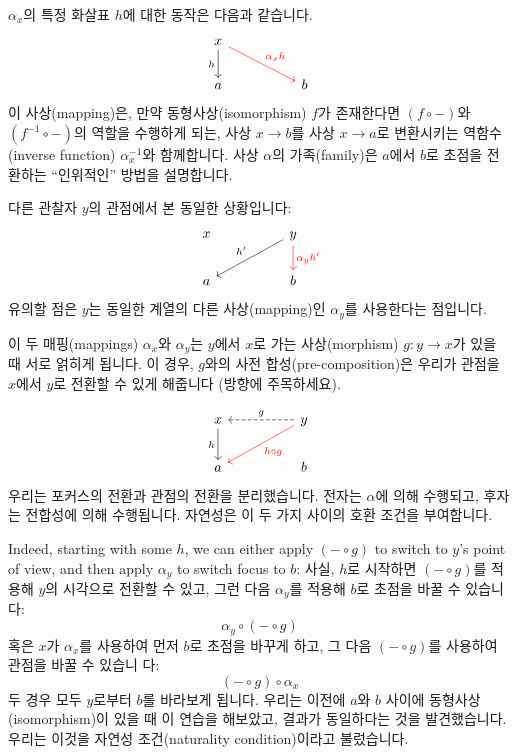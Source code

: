 \documentclass[DaoFP]{subfiles}
\begin{document}
$\alpha_x$의 특정 화살표 $h$에 대한 동작은 다음과 같습니다.
\[
 \begin{tikzcd}
 x
 \arrow[d, "h"']
 \arrow[rrd, red, "\alpha_x h"]
  \\
 a
  && b
 \end{tikzcd}
\]
이 사상(mapping)은, 만약 동형사상(isomorphism) $f$가 존재한다면 $(f \circ -)$와 $(f^{-1} \circ -)$의 역할을 수행하게 되는, 사상 $x \to b$를 사상 $x \to a$로 변환시키는 역함수(inverse function) $\alpha^{-1}_x$와 함께합니다. 사상 $\alpha$의 가족(family)은 $a$에서 $b$로 초점을 전환하는 ``인위적인'' 방법을 설명합니다.

다른 관찰자 $y$의 관점에서 본 동일한 상황입니다:
\[
 \begin{tikzcd}
 x
  && y
 \arrow[lld, "h'"']
 \arrow[d, red, "\alpha_y h'"]
 \\
 a
  && b
 \end{tikzcd}
\]
유의할 점은 $y$는 동일한 계열의 다른 사상(mapping)인 $\alpha_y$를 사용한다는 점입니다.

이 두 매핑(mappings) $\alpha_x$와 $\alpha_y$는 $y$에서 $x$로 가는 사상(morphism) $g \colon y \to x$가 있을 때 서로 얽히게 됩니다. 이 경우, $g$와의 사전 합성(pre-composition)은 우리가 관점을 $x$에서 $y$로 전환할 수 있게 해줍니다 (방향에 주목하세요).

\[
 \begin{tikzcd}
 x
 \arrow[d, "h"']
 && y
 \arrow[ll, dashed, "g"']
 \arrow[lld, red, "h \circ g"]
 \\
 a
  && b
 \end{tikzcd}
\]
우리는 포커스의 전환과 관점의 전환을 분리했습니다. 전자는 $\alpha$에 의해 수행되고, 후자는 전합성에 의해 수행됩니다. 자연성은 이 두 가지 사이의 호환 조건을 부여합니다.

Indeed, starting with some $h$, we can either apply $(- \circ g)$ to switch to $y$'s point of view, and then apply $\alpha_y$ to switch focus to $b$: 사실, $h$로 시작하면 $(- \circ g)$를 적용해 $y$의 시각으로 전환할 수 있고, 그런 다음 $\alpha_y$를 적용해 $b$로 초점을 바꿀 수 있습니다:
\[ \alpha_y \circ (- \circ g) \]
혹은 $x$가 $\alpha_x$를 사용하여 먼저 $b$로 초점을 바꾸게 하고, 그 다음 $(- \circ g)$를 사용하여 관점을 바꿀 수 있습니 다:
\[ (- \circ g) \circ \alpha_x \]
두 경우 모두 $y$로부터 $b$를 바라보게 됩니다. 우리는 이전에 $a$와 $b$ 사이에 동형사상(isomorphism)이 있을 때 이 연습을 해보았고, 결과가 동일하다는 것을 발견했습니다. 우리는 이것을 자연성 조건(naturality condition)이라고 불렀습니다.
\end{document}
